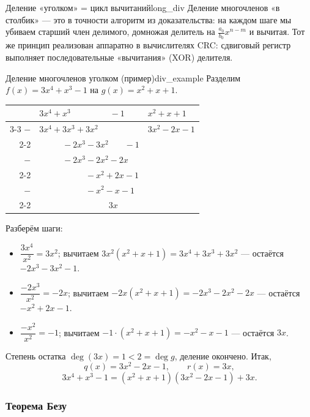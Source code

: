 \documentclass[12pt,a4paper]{article}
\begin{document}
\begin{remarkIT}{Деление «уголком» = цикл вычитаний}{long_div}
Деление многочленов «в столбик» — это в точности алгоритм из
доказательства: на каждом шаге мы убиваем старший член делимого,
домножая делитель на $\frac{a_0}{b_0} x^{n-m}$ и вычитая. Тот же
принцип реализован аппаратно в вычислителях CRC: сдвиговый регистр
выполняет последовательные «вычитания» (XOR) делителя.
\end{remarkIT}

\begin{definition}{Деление многочленов уголком (пример)}{div_example}
Разделим $f(x) = 3x^4 + x^3 - 1$ на $g(x) = x^2 + x + 1$.

\medskip
\begin{center}
\renewcommand{\arraystretch}{1.3}
\begin{tabular}{r@{\;}l|l}
  & $3x^4 + x^3 \phantom{+0x^2+0x} - 1$ & \;$x^2 + x + 1$ \\
  \cline{3-3}
  $-$ & $3x^4 + 3x^3 + 3x^2$ & \;$3x^2 - 2x - 1$ \\
  \cline{2-2}
  & $\phantom{3x^4+}-2x^3 - 3x^2 \phantom{+0x}- 1$ & \\
  $-$ & $\phantom{3x^4+}-2x^3 - 2x^2 - 2x$ & \\
  \cline{2-2}
  & $\phantom{3x^4+2x^3+}-x^2 + 2x - 1$ & \\
  $-$ & $\phantom{3x^4+2x^3+}-x^2 - x - 1$ & \\
  \cline{2-2}
  & $\phantom{3x^4+2x^3+0x^2+}3x$ & \\
\end{tabular}
\end{center}

\medskip
Разберём шаги:
\begin{itemize}
\item $\dfrac{3x^4}{x^2} = 3x^2$; вычитаем
  $3x^2(x^2+x+1) = 3x^4 + 3x^3 + 3x^2$ — остаётся
  $-2x^3 - 3x^2 - 1$.
\item $\dfrac{-2x^3}{x^2} = -2x$; вычитаем
  $-2x(x^2+x+1) = -2x^3 - 2x^2 - 2x$ — остаётся
  $-x^2 + 2x - 1$.
\item $\dfrac{-x^2}{x^2} = -1$; вычитаем
  $-1\cdot(x^2+x+1) = -x^2 - x - 1$ — остаётся $3x$.
\end{itemize}
Степень остатка $\deg(3x) = 1 < 2 = \deg g$, деление окончено.
Итак,
\[
q(x) = 3x^2 - 2x - 1, \qquad r(x) = 3x,
\]
\[
3x^4 + x^3 - 1 = (x^2 + x + 1)(3x^2 - 2x - 1) + 3x.
\]
\end{definition}

\subsubsection*{Теорема Безу}
\end{document}
